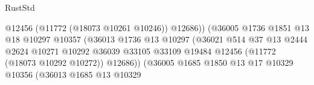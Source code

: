 \begin{lexlean}{RustStd}
\begin{coremodule}
                                                          @12456
                                                          (@11772 (@18073 @10261 @10246))
                                                          @12686))
                                                      (@36005
                                                        @1736
                                                        @1851
                                                        @13
                                                        @18
                                                        @10297
                                                        @10357
                                                        (@36013
                                                          @1736
                                                          @13
                                                          @10297
                                                          (@36021
                                                            @514
                                                            @37
                                                            @13
                                                            @2444
                                                            @2624
                                                            @10271
                                                            @10292
                                                            @36039
                                                            @33105
                                                            @33109
                                                            @19484
                                                            @12456
                                                            (@11772 (@18073 @10292 @10272))
                                                            @12686))
                                                        (@36005
                                                          @1685
                                                          @1850
                                                          @13
                                                          @17
                                                          @10329
                                                          @10356
                                                          (@36013
                                                            @1685
                                                            @13
                                                            @10329

\end{coremodule}
\end{lexlean}
